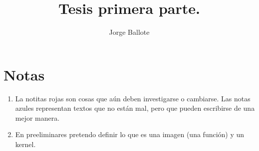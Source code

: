 \documentclass[12pt]{book}
\theoremstyle{plain}
\begin{document}
\title{Tesis primera parte.}
\author{Jorge Ballote}
\thispagestyle{plain}
% 
\tableofcontents
% 
\newpage
{}






 
% 
% 





\chapter{Notas}
    \begin{enumerate}
        \item La notitas rojas son cosas que aún deben investigarse o cambiarse. Las notas azules representan textos que no están mal, pero que pueden escribirse de una mejor manera.
        \item En preeliminares pretendo definir lo que es una imagen (una función) y un kernel.
    \end{enumerate}
\end{document}
